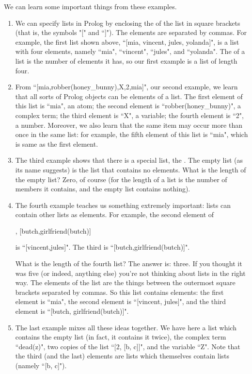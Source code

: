 We can learn some important things from these examples.
\begin{enumerate}
\item{}We can specify lists in Prolog by enclosing the
 of the list in square brackets (that is, the symbols
"[" and ``]").  The elements are separated by commas.  For example, the
first list shown above, ``[mia, vincent, jules, yolanda]", is a list with
four elements, namely ``mia", ``vincent", ``jules", and ``yolanda".  The
 of a list is the number of elements it has, so our
first example is a list of length four.
\item{}From ``[mia,robber(honey\_bunny),X,2,mia]",
our second example,
we learn that all sorts of Prolog
objects can be elements of a list.  The first element of this list is
``mia", an atom; the second element is ``robber(honey\_bunny)",
a complex term; the third element is ``X", a variable; the fourth
element is ``2", a number.  Moreover, we also learn that the same
item may occur more than once in the same list: for example, the fifth
element of this list is ``mia", which is same as the first
element.
\item{}The third example shows that there is a special list,
        the .  The empty list (as its name
        suggests) is the list that contains no elements.  What is the
        length of the empty list?  Zero, of course (for the length of a
        list is the number of members it contains, and the empty list
        contains nothing).
\item{}The fourth example teaches us something extremely important:
        lists can contain other lists as elements.  For example, the
        second element of
        \begin{LPNcodedisplay}
[mia, [vincent, jules], [butch,girlfriend(butch)]
\end{LPNcodedisplay}
 is
        ``[vincent,jules]". The
        third is ``[butch,girlfriend(butch)]".

        What is the length of the fourth list?  The answer is: three.
If you thought it was five (or indeed, anything else) you're not
thinking about lists in the right way.  The elements of the list are
the things between the outermost square brackets separated by commas.
So this list contains  elements: the first element is
``mia", the second element is ``[vincent, jules]", and the
third element is ``[butch, girlfriend(butch)]".
\item{}The last example mixes all these ideas together.  We have
        here a list which contains the empty list (in fact, it contains it
        twice), the complex term ``dead(z)", two copies of the list
        ``[2, [b, c]]", and the variable ``Z".  Note that
        the third (and the last) elements are lists which themselves
        contain lists (namely ``[b, c]").
\end{enumerate}


